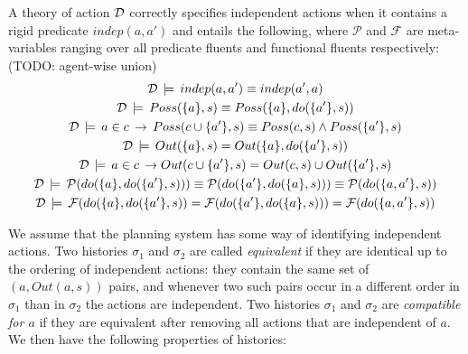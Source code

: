 \begin{defnL}
 A theory of action $\mathcal{D}$ correctly
specifies independent actions when it contains a rigid predicate $indep(a,a')$
and entails the following, where $\mathcal{P}$ and $\mathcal{F}$
are meta-variables ranging over all predicate fluents and functional
fluents respectively: (TODO: agent-wise union)\begin{gather*}
\mathcal{D}\,\models\, indep(a,a')\equiv indep(a',a)\\
\mathcal{D}\,\models\, Poss(\{a\},s)\equiv Poss(\{a\},do(\{a'\},s))\\
\mathcal{D}\,\models\, a\in c\,\rightarrow\, Poss(c\cup\{a'\},s)\equiv Poss(c,s)\wedge Poss(\{a'\},s)\\
\mathcal{D}\,\models\, Out(\{a\},s)=Out(\{a\},do(\{a'\},s))\\
\mathcal{D}\,\models\, a\in c\,\rightarrow Out(c\cup\{a'\},s)=Out(c,s)\cup Out(\{a'\},s)\\
\mathcal{D}\,\models\,\mathcal{P}(do(\{a\},do(\{a'\},s)))\equiv\mathcal{P}(do(\{a'\},do(\{a\},s)))\equiv\mathcal{P}(do(\{a,a'\},s))\\
\mathcal{D}\,\models\,\mathcal{F}(do(\{a\},do(\{a'\},s))=\mathcal{F}(do(\{a'\},do(\{a\},s)))=\mathcal{F}(do(\{a,a'\},s))\end{gather*}

\end{defnL}
We assume that the planning system has some way of identifying independent
actions. Two histories $\sigma_{1}$ and $\sigma_{2}$ are called
\emph{equivalent} if they are identical up to the ordering of independent
actions: they contain the same set of $(a,Out(a,s))$ pairs, and whenever
two such pairs occur in a different order in $\sigma_{1}$ than in
$\sigma_{2}$ the actions are independent. Two histories $\sigma_{1}$
and $\sigma_{2}$ are \emph{compatible for $a$} if they are equivalent
after removing all actions that are independent of $a$. We then have
the following properties of histories:

